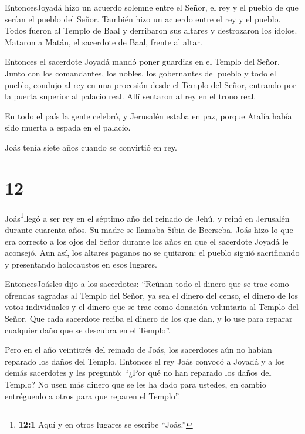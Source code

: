  EntoncesJoyadá hizo un acuerdo solemne entre el Señor, el
rey y el pueblo de que serían el pueblo del Señor. También hizo un
acuerdo entre el rey y el pueblo.  Todos fueron al Templo
de Baal y derribaron sus altares y destrozaron los ídolos. Mataron a
Matán, el sacerdote de Baal, frente al altar.

Entonces el sacerdote Joyadá mandó poner guardias en el Templo del
Señor.  Junto con los comandantes, los nobles, los
gobernantes del pueblo y todo el pueblo, condujo al rey en una procesión
desde el Templo del Señor, entrando por la puerta superior al palacio
real. Allí sentaron al rey en el trono real.

 En todo el país la gente celebró, y Jerusalén estaba en
paz, porque Atalía había sido muerta a espada en el palacio.

 Joás tenía siete años cuando se convirtió en rey.

\hypertarget{section-11}{%
\section{12}\label{section-11}}

 Joás\footnote{\textbf{12:1} Aquí y en otros lugares se
  escribe ``Joás.''}llegó a ser rey en el séptimo año del reinado de
Jehú, y reinó en Jerusalén durante cuarenta años. Su madre se llamaba
Sibia de Beerseba.  Joás hizo lo que era correcto a los ojos
del Señor durante los años en que el sacerdote Joyadá le aconsejó.
 Aun así, los altares paganos no se quitaron: el pueblo
siguió sacrificando y presentando holocaustos en esos lugares.

 EntoncesJoásles dijo a los sacerdotes: ``Reúnan todo el
dinero que se trae como ofrendas sagradas al Templo del Señor, ya sea el
dinero del censo, el dinero de los votos individuales y el dinero que se
trae como donación voluntaria al Templo del Señor.  Que cada
sacerdote reciba el dinero de los que dan, y lo use para reparar
cualquier daño que se descubra en el Templo''.

 Pero en el año veintitrés del reinado de Joás, los
sacerdotes aún no habían reparado los daños del Templo. 
Entonces el rey Joás convocó a Joyadá y a los demás sacerdotes y les
preguntó: ``¿Por qué no han reparado los daños del Templo? No usen más
dinero que se les ha dado para ustedes, en cambio entréguenlo a otros
para que reparen el Templo''.

